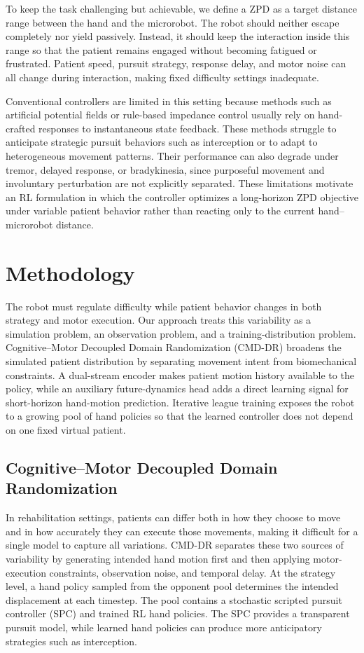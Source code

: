 \documentclass[lettersize,journal]{IEEEtran}
\begin{document}
To keep the task challenging but achievable, we define a ZPD as a target distance range between the hand and the microrobot. The robot should neither escape completely nor yield passively. Instead, it should keep the interaction inside this range so that the patient remains engaged without becoming fatigued or frustrated. Patient speed, pursuit strategy, response delay, and motor noise can all change during interaction, making fixed difficulty settings inadequate.

Conventional controllers are limited in this setting because methods such as artificial potential fields or rule-based impedance control usually rely on hand-crafted responses to instantaneous state feedback. These methods struggle to anticipate strategic pursuit behaviors such as interception or to adapt to heterogeneous movement patterns. Their performance can also degrade under tremor, delayed response, or bradykinesia, since purposeful movement and involuntary perturbation are not explicitly separated. These limitations motivate an RL formulation in which the controller optimizes a long-horizon ZPD objective under variable patient behavior rather than reacting only to the current hand--microrobot distance.

\section{Methodology}
The robot must regulate difficulty while patient behavior changes in both strategy and motor execution. Our approach treats this variability as a simulation problem, an observation problem, and a training-distribution problem. Cognitive--Motor Decoupled Domain Randomization (CMD-DR) broadens the simulated patient distribution by separating movement intent from biomechanical constraints. A dual-stream encoder makes patient motion history available to the policy, while an auxiliary future-dynamics head adds a direct learning signal for short-horizon hand-motion prediction. Iterative league training exposes the robot to a growing pool of hand policies so that the learned controller does not depend on one fixed virtual patient.

\subsection{Cognitive--Motor Decoupled Domain Randomization}
In rehabilitation settings, patients can differ both in how they choose to move and in how accurately they can execute those movements, making it difficult for a single model to capture all variations. CMD-DR separates these two sources of variability by generating intended hand motion first and then applying motor-execution constraints, observation noise, and temporal delay. At the strategy level, a hand policy sampled from the opponent pool determines the intended displacement at each timestep. The pool contains a stochastic scripted pursuit controller (SPC) and trained RL hand policies. The SPC provides a transparent pursuit model, while learned hand policies can produce more anticipatory strategies such as interception.
\end{document}
